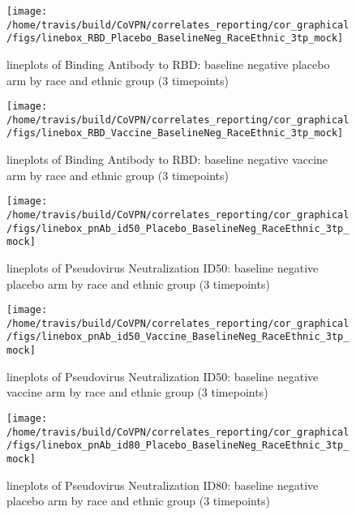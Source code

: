 \documentclass[]{book}
\theoremstyle{definition}
\theoremstyle{definition}
\theoremstyle{definition}
\newcommand{\1}{\mathbbm{1}}
\begin{document}
\clearpage
\begin{figure}[H]

{\centering \texttt{[image: /home/travis/build/CoVPN/correlates\_reporting/cor\_graphical/figs/linebox\_RBD\_Placebo\_BaselineNeg\_RaceEthnic\_3tp\_mock]} 

}

\caption{lineplots of Binding Antibody to RBD: baseline negative placebo arm by race and ethnic group (3 timepoints)}\label{fig:unnamed-chunk-205}
\end{figure}

\clearpage
\begin{figure}[H]

{\centering \texttt{[image: /home/travis/build/CoVPN/correlates\_reporting/cor\_graphical/figs/linebox\_RBD\_Vaccine\_BaselineNeg\_RaceEthnic\_3tp\_mock]} 

}

\caption{lineplots of Binding Antibody to RBD: baseline negative vaccine arm by race and ethnic group (3 timepoints)}\label{fig:unnamed-chunk-206}
\end{figure}

\clearpage
\begin{figure}[H]

{\centering \texttt{[image: /home/travis/build/CoVPN/correlates\_reporting/cor\_graphical/figs/linebox\_pnAb\_id50\_Placebo\_BaselineNeg\_RaceEthnic\_3tp\_mock]} 

}

\caption{lineplots of Pseudovirus Neutralization ID50: baseline negative placebo arm by race and ethnic group (3 timepoints)}\label{fig:unnamed-chunk-207}
\end{figure}

\clearpage
\begin{figure}[H]

{\centering \texttt{[image: /home/travis/build/CoVPN/correlates\_reporting/cor\_graphical/figs/linebox\_pnAb\_id50\_Vaccine\_BaselineNeg\_RaceEthnic\_3tp\_mock]} 

}

\caption{lineplots of Pseudovirus Neutralization ID50: baseline negative vaccine arm by race and ethnic group (3 timepoints)}\label{fig:unnamed-chunk-208}
\end{figure}

\clearpage
\begin{figure}[H]

{\centering \texttt{[image: /home/travis/build/CoVPN/correlates\_reporting/cor\_graphical/figs/linebox\_pnAb\_id80\_Placebo\_BaselineNeg\_RaceEthnic\_3tp\_mock]} 

}

\caption{lineplots of Pseudovirus Neutralization ID80: baseline negative placebo arm by race and ethnic group (3 timepoints)}\label{fig:unnamed-chunk-209}
\end{figure}
\end{document}

